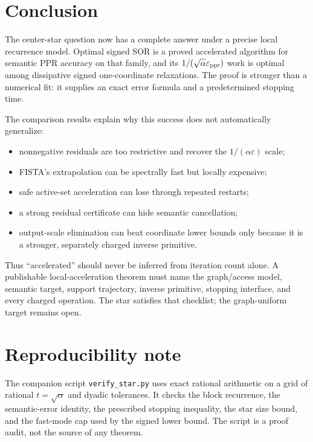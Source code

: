 \section{Conclusion}
\label{sec:signed-star-conclusion}

The center-star question now has a complete answer under a precise local
recurrence model.  Optimal signed SOR is a proved accelerated algorithm for
semantic PPR accuracy on that family, and its
$1/(\sqrt\alpha\varepsilon_{\rm ppr})$ work is optimal among dissipative
signed one-coordinate relaxations.  The proof is stronger than a numerical
fit: it supplies an exact error formula and a predetermined stopping time.

The comparison results explain why this success does not automatically
generalize:
\begin{itemize}[leftmargin=*]
\item nonnegative residuals are too restrictive and recover the
      $1/(\alpha\varepsilon)$ scale;
\item FISTA's extrapolation can be spectrally fast but locally expensive;
\item safe active-set acceleration can lose through repeated restarts;
\item a strong residual certificate can hide semantic cancellation;
\item output-scale elimination can beat coordinate lower bounds only because
      it is a stronger, separately charged inverse primitive.
\end{itemize}

Thus ``accelerated'' should never be inferred from iteration count alone.  A
publishable local-acceleration theorem must name the graph/access model,
semantic target, support trajectory, inverse primitive, stopping interface,
and every charged operation.  The star satisfies that checklist; the
graph-uniform target remains open.

\section*{Reproducibility note}

The companion script \texttt{verify\_star.py} uses exact rational arithmetic
on a grid of rational $t=\sqrt\alpha$ and dyadic tolerances.  It checks the
block recurrence, the semantic-error identity, the prescribed stopping
inequality, the star size bound, and the fast-mode cap used by the signed
lower bound.  The script
is a proof audit, not the source of any theorem.

